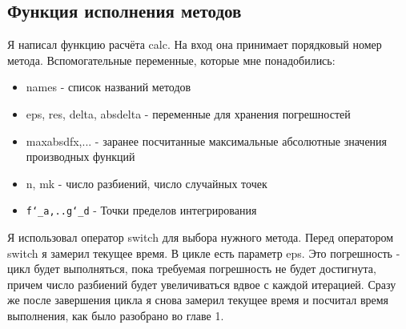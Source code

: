 \documentclass{article}
\begin{document}
\subsection{Функция исполнения методов}
Я написал функцию расчёта calc. На вход она принимает порядковый номер метода.
Вспомогательные переменные, которые мне понадобились:
\begin{itemize}
    \item names - список названий методов
    \item eps, res, delta, absdelta - переменные для хранения погрешностей
    \item maxabsdfx,... - заранее посчитанные максимальные абсолютные значения производных функций
    \item n, mk - число разбиений, число случайных точек
    \item \texttt{f\char`_a,..g\char`_d} - Точки пределов интегрирования
\end{itemize}
Я использовал оператор switch для выбора нужного метода. Перед оператором switch я замерил текущее время. В цикле есть параметр eps. Это погрешность - цикл будет выполняться, пока требуемая погрешность не будет достигнута, причем число разбиений будет увеличиваться вдвое с каждой итерацией. Сразу же после завершения цикла я снова замерил текущее время и посчитал время выполнения, как было разобрано во главе 1.
\end{document}
